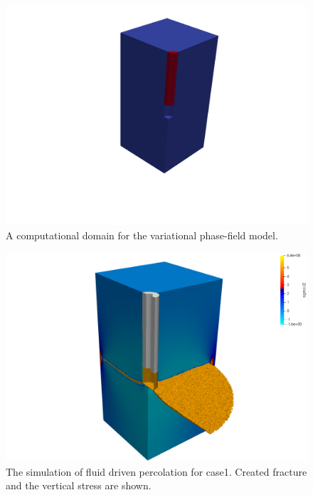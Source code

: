 \begin{figure}[!ht]
\centering
\includegraphics[width=1.0\textwidth]{figures/VPF_init.png}
\caption{A computational domain for the variational phase-field model.}
\label{fig:VPF_init}
\end{figure}

\begin{figure}[!ht]
\includegraphics[width=1\textwidth]{figures/VPF_ME2_case1.png}
\caption{The simulation of fluid driven percolation for case1. Created fracture and the vertical stress are shown.}
\label{fig:Keita_ME2_VPF_case1}
\end{figure}

